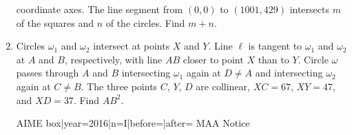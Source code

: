 \documentclass{article}
\begin{document}
\begin{enumerate}[label=\arabic*., itemsep=0.5em]
coordinate axes. The line segment from $(0,0)$ to $(1001, 429)$ intersects $m$ of the squares and $n$ of the circles. Find $m + n$.\par \vspace{0.5em}\item Circles $\omega_1$ and $\omega_2$ intersect at points $X$ and $Y$. Line $\ell$ is tangent to $\omega_1$ and $\omega_2$ at $A$ and $B$, respectively, with line $AB$ closer to point $X$ than to $Y$. Circle $\omega$ passes through $A$ and $B$ intersecting $\omega_1$ again at $D \neq A$ and intersecting $\omega_2$ again at $C \neq B$. The three points $C$, $Y$, $D$ are collinear, $XC = 67$, $XY = 47$, and $XD = 37$. Find $AB^2$.



{{AIME box|year=2016|n=I|before=|after=}}
{{MAA Notice}}\par \vspace{0.5em}\end{enumerate}
\end{document}

